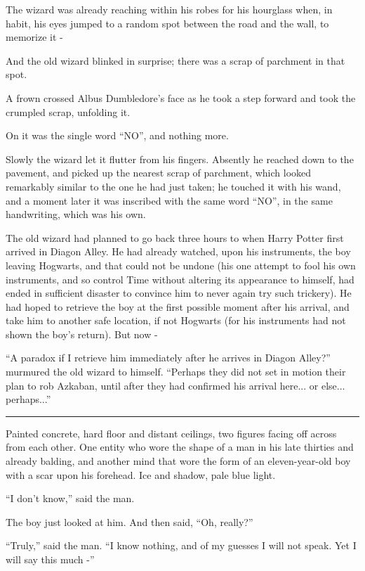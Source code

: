 The wizard was already reaching within his robes for his hourglass when,
in habit, his eyes jumped to a random spot between the road and the
wall, to memorize it -

And the old wizard blinked in surprise; there was a scrap of parchment
in that spot.

A frown crossed Albus Dumbledore's face as he took a step forward and
took the crumpled scrap, unfolding it.

On it was the single word ``NO'', and nothing more.

Slowly the wizard let it flutter from his fingers. Absently he reached
down to the pavement, and picked up the nearest scrap of parchment,
which looked remarkably similar to the one he had just taken; he touched
it with his wand, and a moment later it was inscribed with the same word
``NO'', in the same handwriting, which was his own.

The old wizard had planned to go back three hours to when Harry Potter
first arrived in Diagon Alley. He had already watched, upon his
instruments, the boy leaving Hogwarts, and that could not be undone (his
one attempt to fool his own instruments, and so control Time without
altering its appearance to himself, had ended in sufficient disaster to
convince him to never again try such trickery). He had hoped to retrieve
the boy at the first possible moment after his arrival, and take him to
another safe location, if not Hogwarts (for his instruments had not
shown the boy's return). But now -

``A paradox if I retrieve him immediately after he arrives in Diagon
Alley?'' murmured the old wizard to himself. ``Perhaps they did not set
in motion their plan to rob Azkaban, until after they had confirmed his
arrival here... or else... perhaps...''

\begin{center}\rule{3in}{0.4pt}\end{center}

Painted concrete, hard floor and distant ceilings, two figures facing
off across from each other. One entity who wore the shape of a man in
his late thirties and already balding, and another mind that wore the
form of an eleven-year-old boy with a scar upon his forehead. Ice and
shadow, pale blue light.

``I don't know,'' said the man.

The boy just looked at him. And then said, ``Oh, really?''

``Truly,'' said the man. ``I know nothing, and of my guesses I will not
speak. Yet I will say this much -''
